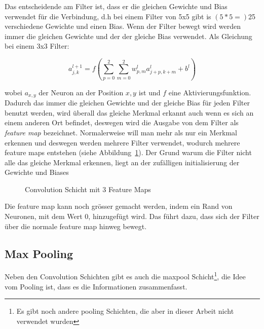 \documentclass[12pt,a4paper]{report}
\begin{document}
Das entscheidende am Filter ist, dass er die gleichen Gewichte und Bias verwendet für die Verbindung, d.h bei einem
Filter von 5x5 gibt is $(5*5=)$25 verschiedene Gewichte und einen Bias.
Wenn der Filter bewegt wird werden immer die gleichen Gewichte und der der gleiche Bias verwendet.
Als Gleichung bei einem 3x3 Filter:

\[a^{l+1}_{j,k} = f\left(\sum_{p=0}^{2}\sum_{m=0}^{2}w^l_{p,m}a^l_{j+p,k+m} + b^l\right)\]

wobei $a_{x, y}$ der Neuron an der Position $x, y$ ist und $f$ eine Aktivierungsfunktion.
Dadurch das immer die gleichen Gewichte und der gleiche Bias für jeden Filter benutzt werden,
wird überall das gleiche Merkmal erkannt auch wenn es sich an einem anderen Ort befindet,
deswegen wird die Ausgabe von dem Filter als \textit{feature map} bezeichnet.
Normalerweise will man mehr als nur ein Merkmal erkennen und deswegen werden mehrere Filter verwendet,
wodurch mehrere feature maps entstehen (siehe Abbildung~\ref{fig:conv4}).
Der Grund warum die Filter nicht alle das gleiche Merkmal erkennen, liegt an der zufälligen initialisierung der Gewichte und Biases

\begin{figure}[h]%
    \centering
{}
    \caption{Convolution Schicht mit 3 Feature Maps}%
    \label{fig:conv4}
\end{figure}

Die feature map kann noch grösser gemacht werden, indem ein Rand von Neuronen, mit dem Wert 0, hinzugefügt wird.\cite{conv}
Das führt dazu, dass sich der Filter über die normale feature map hinweg bewegt.

\subsection{Max Pooling}
Neben den Convolution Schichten gibt es auch die maxpool Schicht\footnote{Es gibt noch andere pooling Schichten, die aber in dieser Arbeit nicht verwendet wurden},
die Idee vom Pooling ist, dass es die Informationen zusammenfasst.
\end{document}
